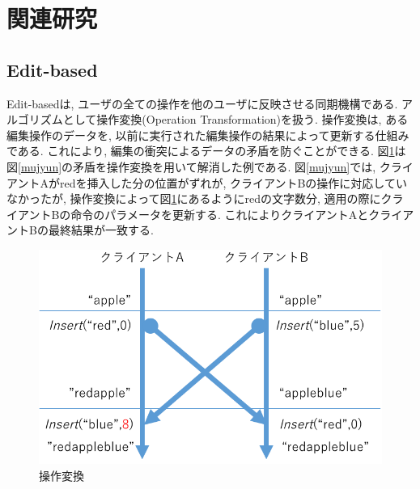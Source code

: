 \section{関連研究}
%
\subsection{Edit-based}
Edit-basedは, ユーザの全ての操作を他のユーザに反映させる同期機構である.
アルゴリズムとして操作変換(Operation Transformation)\cite{OT}を扱う.
操作変換は, ある編集操作のデータを, 以前に実行された編集操作の結果によって更新する仕組みである.
これにより, 編集の衝突によるデータの矛盾を防ぐことができる.
図\ref{ot}は図\ref{mujyun}の矛盾を操作変換を用いて解消した例である. 図\ref{mujyun}では, クライアントAがredを挿入した分の位置がずれが, クライアントBの操作に対応していなかったが, 操作変換によって図\ref{ot}にあるようにredの文字数分, 適用の際にクライアントBの命令のパラメータを更新する. これによりクライアントAとクライアントBの最終結果が一致する.
\begin{figure}[htbp]
  \begin{center}
    \includegraphics[scale=0.4]{images/ot}
    \caption{操作変換}
    \label{ot}
  \end{center}
\end{figure}
%
